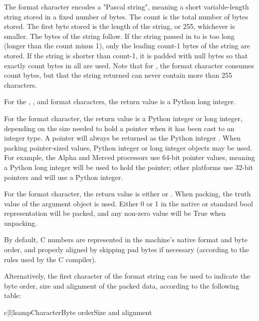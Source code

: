 The  format character encodes a "Pascal string", meaning
a short variable-length string stored in a fixed number of bytes.
The count is the total number of bytes stored.  The first byte stored is
the length of the string, or 255, whichever is smaller.  The bytes
of the string follow.  If the string passed in to  is too
long (longer than the count minus 1), only the leading count-1 bytes of the
string are stored.  If the string is shorter than count-1, it is padded
with null bytes so that exactly count bytes in all are used.  Note that
for , the  format character consumes count
bytes, but that the string returned can never contain more than 255
characters.

For the , ,  and 
format characters, the return value is a Python long integer.

For the  format character, the return value is a Python
integer or long integer, depending on the size needed to hold a
pointer when it has been cast to an integer type.  A \NULL{} pointer will
always be returned as the Python integer . When packing pointer-sized
values, Python integer or long integer objects may be used.  For
example, the Alpha and Merced processors use 64-bit pointer values,
meaning a Python long integer will be used to hold the pointer; other
platforms use 32-bit pointers and will use a Python integer.

For the  format character, the return value is either
 or . When packing, the truth value
of the argument object is used. Either 0 or 1 in the native or standard
bool representation will be packed, and any non-zero value will be True
when unpacking.

By default, C numbers are represented in the machine's native format
and byte order, and properly aligned by skipping pad bytes if
necessary (according to the rules used by the C compiler).

Alternatively, the first character of the format string can be used to
indicate the byte order, size and alignment of the packed data,
according to the following table:

\begin{tableiii}{c|l|l}{samp}{Character}{Byte order}{Size and alignment}
\end{tableiii}

